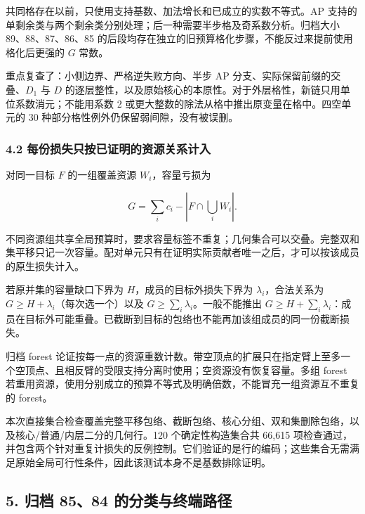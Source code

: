 \documentclass[
  11pt,
  a4paper,
]{article}
\begin{document}
共同格存在以前，只使用支持基数、加法增长和已成立的实数不等式。AP
支持的单剩余类与两个剩余类分别处理；后一种需要半步格及奇系数分析。归档大小
89、88、87、86、85
的后段均存在独立的旧预算格化步骤，不能反过来提前使用格化后更强的 \(G\)
常数。

重点复查了：小侧边界、严格逆失败方向、半步 AP
分支、实际保留前缀的交叠、\(D_1\) 与 \(D\)
的逐层整性，以及原始核心的本原性。对于外层格性，新链只用单位系数消元；不能用系数
2 或更大整数的除法从格中推出原变量在格中。四空单元的 30
种部分格性例外仍保留弱间隙，没有被误删。

\hypertarget{ux6bcfux4efdux635fux5931ux53eaux6309ux5df2ux8bc1ux660eux7684ux8d44ux6e90ux5173ux7cfbux8ba1ux5165}{%
\subsubsection{4.2
每份损失只按已证明的资源关系计入}\label{ux6bcfux4efdux635fux5931ux53eaux6309ux5df2ux8bc1ux660eux7684ux8d44ux6e90ux5173ux7cfbux8ba1ux5165}}

对同一目标 \(F\) 的一组覆盖资源 \(W_i\)，容量亏损为

\[G=\sum_i c_i-\left|F\cap\bigcup_iW_i\right|.\]

不同资源组共享全局预算时，要求容量标签不重复；几何集合可以交叠。完整双和集平移只记一次容量。配对单元只有在证明实际贡献者唯一之后，才可以按该成员的原生损失计入。

若原并集的容量缺口下界为 \(H\)，成员的目标外损失下界为
\(\lambda_i\)，合法关系为 \(G\ge H+\lambda_i\)（每次选一个）以及
\(G\ge\sum_i\lambda_i\)。一般不能推出
\(G\ge H+\sum_i\lambda_i\)：成员在目标外可能重叠。已截断到目标的包络也不能再加该组成员的同一份截断损失。

归档 forest
论证按每一点的资源重数计数。带空顶点的扩展只在指定臂上至多一个空顶点、且相反臂的受限支持分离时使用；空资源没有恢复容量。多组
forest
若重用资源，使用分别成立的预算不等式及明确倍数，不能冒充一组资源互不重复的
forest。

本次直接集合检查覆盖完整平移包络、截断包络、核心分组、双和集删除包络，以及核心/普通/内层二分的几何行。120
个确定性构造集合共 66,615
项检查通过，并包含两个针对重复计损失的反例控制。它们验证的是行的编码；这些集合无需满足原始全局可行性条件，因此该测试本身不是基数排除证明。

\hypertarget{ux5f52ux6863-8584-ux7684ux5206ux7c7bux4e0eux7ec8ux7aefux8defux5f84}{%
\subsection{5. 归档 85、84
的分类与终端路径}\label{ux5f52ux6863-8584-ux7684ux5206ux7c7bux4e0eux7ec8ux7aefux8defux5f84}}
\end{document}
